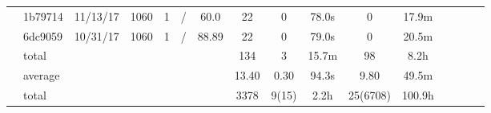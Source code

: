 \begin{table}
\begin{tabular}{llrccccccccccccc}
		& \cellcolor{gray!25} 1b79714  & \cellcolor{gray!25} 11/13/17 & \cellcolor{gray!25} 1060  & \cellcolor{gray!25} 1  & \cellcolor{gray!25} {\color{ForestGreen}{20\xspace}} / {\color{red}{5\xspace}}  & \cellcolor{gray!25} 60.0  & \cellcolor{gray!25} 22  & \cellcolor{gray!25} 0  & \cellcolor{gray!25} 78.0s  & \cellcolor{gray!25} 0  & \cellcolor{gray!25} 17.9m\\
		&  6dc9059  &  10/31/17 &  1060  &  1  &  {\color{ForestGreen}{4\xspace}} / {\color{red}{14\xspace}}  &  88.89  &  22  &  0  &  79.0s  &  0  &  20.5m\\
		\midrule
		& \cellcolor{gray!25} total  & \cellcolor{gray!25} \xspace{} & \cellcolor{gray!25} \xspace{}  & \cellcolor{gray!25} \xspace{}  & \cellcolor{gray!25} \xspace{}  & \cellcolor{gray!25} \xspace{}  & \cellcolor{gray!25} 134  & \cellcolor{gray!25} 3  & \cellcolor{gray!25} 15.7m  & \cellcolor{gray!25} 98  & \cellcolor{gray!25} 8.2h\\
		&  average  &  \xspace{} &  \xspace{}  &  \xspace{}  &  \xspace{}  &  \xspace{}  &  13.40  &  0.30  &  94.3s  &  9.80  &  49.5m\\
		\midrule
		\midrule
		& \cellcolor{gray!25} total  & \cellcolor{gray!25} \xspace{} & \cellcolor{gray!25} \xspace{}  & \cellcolor{gray!25} \xspace{}  & \cellcolor{gray!25} \xspace{}  & \cellcolor{gray!25} \xspace{}  & \cellcolor{gray!25} 3378  & \cellcolor{gray!25} 9(15)  & \cellcolor{gray!25} 2.2h  & \cellcolor{gray!25} 25(6708)  & \cellcolor{gray!25} 100.9h\\
		\bottomrule
\end{tabular}
\end{table}